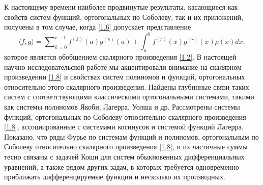 К настоящему времени наиболее продвинутые результаты, касающиеся как  свойств систем  функций, ортогональных по Соболеву, так и их приложений,  получены в том случае, когда \eqref{1.6} допускает представление
\begin{equation}\label{1.8}
\langle f,g\rangle=\sum\nolimits_{k=0}^{r-1}f^{(k)}(a)g^{(k)}(a)+\int_{a}^{b}f^{(r)}(x)g^{(r)}(x)\rho(x)dx,
\end{equation}
которое является обобщением скалярного произведения \eqref{1.2}. В настоящей научно-исследовательской работе мы акцентировали внимание на скалярном произведении \eqref{1.8} и свойствах систем полиномов и функций, ортогональных относительно этого скалярного произведения. Найдены глубинные связи таких систем с соответствующими классическими ортогональными системами, такими как системы полиномов Якоби, Лагерра, Уолша и др. Рассмотрены системы функций, ортогональных по Соболеву относительно скалярного произведения \eqref{1.8}, ассоциированные с системами косинусов и системой функций Лагерра.  Показано, что  ряды Фурье по системам функций и полиномов, ортогональным по Соболеву относительно скалярного произведения \eqref{1.8}, и их частичные суммы тесно связаны с задачей Коши для систем обыкновенных дифференциальных уравнений, а также рядом других задач, в которых требуется одновременно приближать дифференцируемые функции и несколько их производных.


